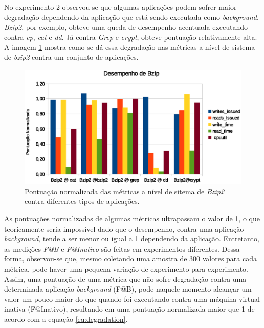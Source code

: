 No experimento 2 observou-se que algumas aplicações podem sofrer maior degradação dependendo da aplicação que está sendo executada como \textit{background}. \textit{Bzip2}, por exemplo, obteve uma queda de desempenho acentuada executando contra \textit{cp}, \textit{cat} e \textit{dd}. Já contra \textit{Grep} e \textit{crypt}, obteve pontuação relativamente alta. A imagem \ref{bzip_performance} mostra como se dá essa degradação nas métricas a nível de sistema de \textit{bzip2} contra um conjunto de aplicações. 
\begin{figure}[!h]
\centering
\includegraphics [keepaspectratio=true,scale=1.0]{graficos/bzip_performance.eps}
\caption{Pontuação normalizada das métricas a nível de sitema de \textit{Bzip2} contra diferentes tipos de aplicações.}
\label{bzip_performance}
\end{figure}  

As pontuações normalizadas de algumas métricas ultrapassam o valor de 1, o que teoricamente seria impossível dado que o desempenho, contra uma aplicação \textit{background}, tende a ser menor ou igual a 1 dependendo da aplicação. Entretanto, as medições \textit{F@B} e \textit{F@Inativo} são feitas em experimentos diferentes. Dessa forma, observou-se que, mesmo coletando uma amostra de 300 valores para cada métrica, pode haver uma pequena variação de experimento para experimento. Assim, uma pontuação de uma métrica que não sofre degradação contra uma determinada aplicação \textit{background} (F@B), pode naquele momento alcançar um valor um pouco maior do que quando foi executando contra uma máquina virtual inativa (F@Inativo), resultando em uma pontuação normalizada maior que 1 de acordo com a equação \ref{eq:degradation}.

